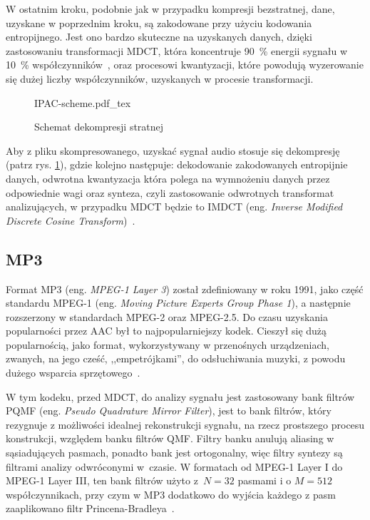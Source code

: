 \documentclass[pl,12pt]{aghdpl}
\let\Oldsubsection\subsection%
\renewcommand{\subsection}{\FloatBarrier\Oldsubsection}
\begin{document}
W ostatnim kroku, podobnie jak w przypadku kompresji bezstratnej, dane,
uzyskane w poprzednim kroku, są zakodowane przy użyciu kodowania entropijnego.
Jest ono bardzo skuteczne na uzyskanych danych, dzięki zastosowaniu
transformacji MDCT, która koncentruje \SI{90}{\percent} energii sygnału w
\SI{10}{\percent} współczynników~\cite{WangYaroslavskyVilermoVaananen2000}, oraz
procesowi kwantyzacji, które powodują wyzerowanie się dużej liczby
współczynników, uzyskanych w procesie transformacji.

\begin{figure}[!tbh]
  \centering
  {IPAC-scheme.pdf_tex}
  \caption{Schemat dekompresji stratnej}
  \label{fig:IPAC_scheme}
\end{figure}

Aby z pliku skompresowanego, uzyskać sygnał audio stosuje się dekompresję
(patrz rys. \ref{fig:IPAC_scheme}), gdzie kolejno następuje: dekodowanie
zakodowanych entropijnie danych, odwrotna kwantyzacja która polega na
wymnożeniu danych przez odpowiednie wagi oraz synteza, czyli zastosowanie
odwrotnych transformat analizujących, w przypadku MDCT będzie to IMDCT (eng.
\textit{Inverse Modified Discrete Cosine Transform})~\cite{Brandenburg1999}.

\subsection{MP3}
Format MP3 (eng. \textit{MPEG-1 Layer 3}) został zdefiniowany w roku 1991, jako
część standardu MPEG-1 (eng. \textit{Moving Picture Experts Group Phase 1}), a
następnie rozszerzony w standardach MPEG-2 oraz
MPEG-2.5. Do czasu uzyskania popularności przez AAC był
to najpopularniejszy kodek. Cieszył się dużą popularnością, jako format,
wykorzystywany w przenośnych urządzeniach, zwanych, na jego cześć,
,,empetrójkami'', do odsłuchiwania muzyki, z powodu dużego wsparcia
sprzętowego~\cite{Brandenburg1999}.

W tym kodeku, przed MDCT, do analizy sygnału jest zastosowany bank
filtrów PQMF (eng. \textit{Pseudo Quadrature Mirror Filter}), jest to bank
filtrów, który rezygnuje z możliwości idealnej rekonstrukcji sygnału, na rzecz
prostszego procesu konstrukcji, względem banku filtrów QMF. Filtry banku
anulują aliasing w sąsiadujących pasmach, ponadto bank jest ortogonalny, więc
filtry syntezy są filtrami analizy odwróconymi w~czasie.  W formatach od MPEG-1
Layer I do MPEG-1 Layer III, ten bank filtrów użyto z~$N = 32$ pasmami i o $M =
512$ współczynnikach, przy czym w MP3 dodatkowo do wyjścia każdego z pasm
zaaplikowano filtr Princena-Bradleya~\cite{Smith2011}.
\end{document}

